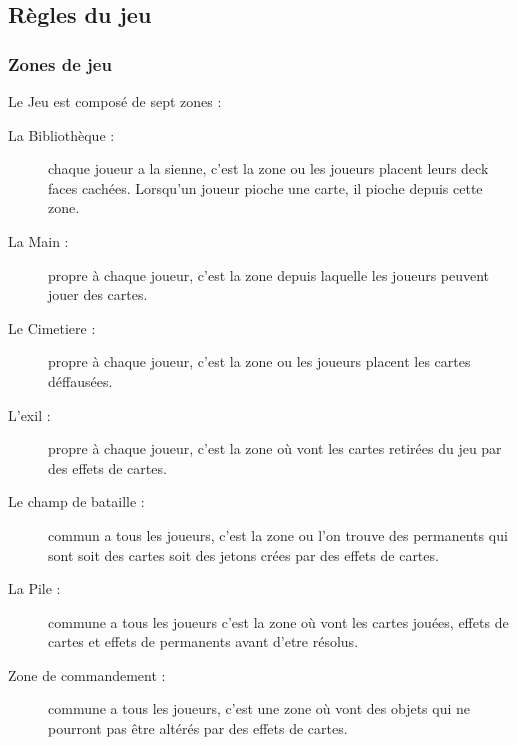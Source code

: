 \documentclass[a4paper,12pt]{article}
\begin{document}
\subsection{Règles du jeu}

\subsubsection{Zones de jeu}
Le Jeu est composé de sept zones :

\begin{description}
\item[La Bibliothèque :] chaque joueur a la sienne, c'est la zone ou les joueurs placent leurs deck faces cachées.
Lorsqu'un joueur pioche une carte, il pioche depuis cette zone.
\item[La Main :] propre à chaque joueur, c'est la zone depuis laquelle les joueurs peuvent jouer des cartes.
\item[Le Cimetiere :] propre à chaque joueur, c'est la zone ou les joueurs placent les cartes déffausées.
\item[L'exil :] propre à chaque joueur, c'est la zone où vont les cartes retirées du jeu par des effets de cartes.
\item[Le champ de bataille :] commun a tous les joueurs, c'est la zone ou l'on trouve des permanents qui sont soit des cartes soit des jetons crées par des effets de cartes.
\item[La Pile :] commune a tous les joueurs c'est la zone où vont les cartes jouées, effets de cartes et effets de permanents avant d'etre résolus.
\item[Zone de commandement :] commune a tous les joueurs, c'est une zone où vont des objets qui ne pourront pas être altérés par des effets de cartes.




\end{description}
\end{document}
